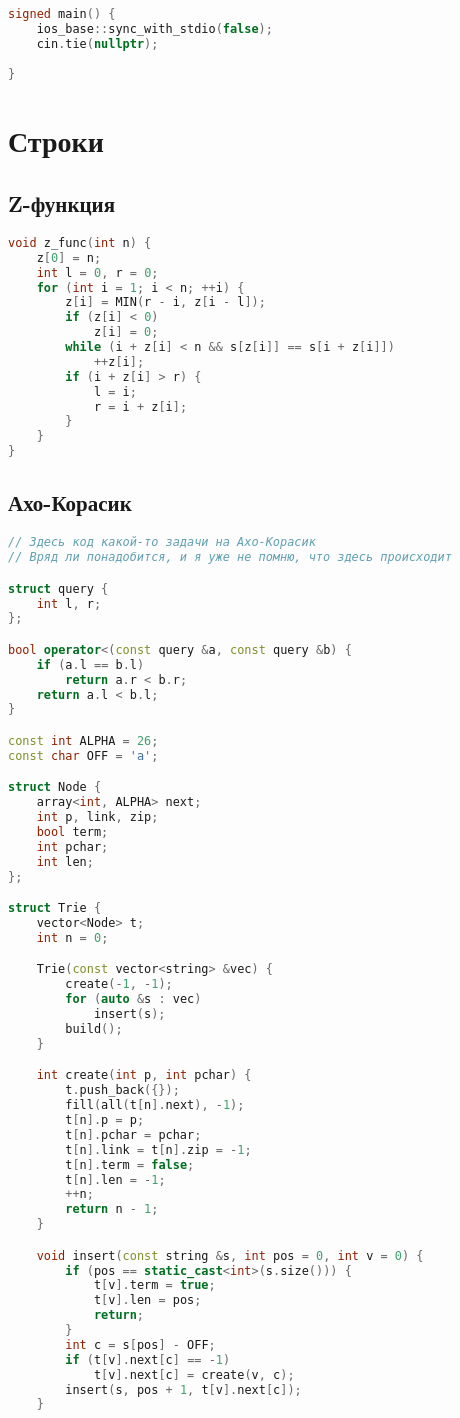 \documentclass[10pt,a4paper,landscape,twosided]{extarticle}
\begin{document}
\begin{multicols}{3}
\begin{lstlisting}[language=C++]
signed main() {
    ios_base::sync_with_stdio(false);
    cin.tie(nullptr);
  
}
\end{lstlisting}

\section{Строки}

\subsection{Z-функция}
\begin{lstlisting}[language=C++]
void z_func(int n) {
    z[0] = n;
    int l = 0, r = 0;
    for (int i = 1; i < n; ++i) {
        z[i] = MIN(r - i, z[i - l]);
        if (z[i] < 0)
            z[i] = 0;
        while (i + z[i] < n && s[z[i]] == s[i + z[i]])
            ++z[i];
        if (i + z[i] > r) {
            l = i;
            r = i + z[i];
        }
    }
}
\end{lstlisting}

\subsection{Ахо-Корасик}
\begin{lstlisting}[language=C++]
// Здесь код какой-то задачи на Ахо-Корасик
// Вряд ли понадобится, и я уже не помню, что здесь происходит

struct query {
    int l, r;
};

bool operator<(const query &a, const query &b) {
    if (a.l == b.l)
        return a.r < b.r;
    return a.l < b.l;
}

const int ALPHA = 26;
const char OFF = 'a';

struct Node {
    array<int, ALPHA> next;
    int p, link, zip;
    bool term;
    int pchar;
    int len;
};

struct Trie {
    vector<Node> t;
    int n = 0;

    Trie(const vector<string> &vec) {
        create(-1, -1);
        for (auto &s : vec)
            insert(s);
        build();
    }

    int create(int p, int pchar) {
        t.push_back({});
        fill(all(t[n].next), -1);
        t[n].p = p;
        t[n].pchar = pchar;
        t[n].link = t[n].zip = -1;
        t[n].term = false;
        t[n].len = -1;
        ++n;
        return n - 1;
    }

    void insert(const string &s, int pos = 0, int v = 0) {
        if (pos == static_cast<int>(s.size())) {
            t[v].term = true;
            t[v].len = pos;
            return;
        }
        int c = s[pos] - OFF;
        if (t[v].next[c] == -1)
            t[v].next[c] = create(v, c);
        insert(s, pos + 1, t[v].next[c]);
    }


\end{lstlisting}
\end{multicols}
\end{document}
